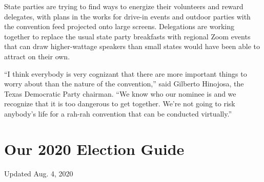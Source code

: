 State parties are trying to find ways to energize their volunteers and
reward delegates, with plans in the works for drive-in events and
outdoor parties with the convention feed projected onto large screens.
Delegations are working together to replace the usual state party
breakfasts with regional Zoom events that can draw higher-wattage
speakers than small states would have been able to attract on their own.

``I think everybody is very cognizant that there are more important
things to worry about than the nature of the convention,'' said Gilberto
Hinojosa, the Texas Democratic Party chairman. ``We know who our nominee
is and we recognize that it is too dangerous to get together. We're not
going to risk anybody's life for a rah-rah convention that can be
conducted virtually.''

\hypertarget{our-2020-election-guide}{%
\section{Our 2020 Election Guide}\label{our-2020-election-guide}}

Updated Aug. 4, 2020


